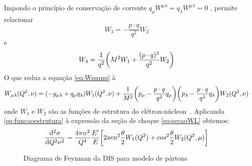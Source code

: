 Impondo o princípio de conservação de corrente $q_\mu W^{\mu\lambda} = q_ \lambda W^{\mu\lambda} = 0$ , permite relacionar
\begin{equation}
    W_ 3 = - \frac{p\cdot q}{q^2} W_ 2
\end{equation}
e
\begin{equation}
    W_ 4 = \frac{1}{q^2} \qty(M^2 W_1 + \frac{(p\cdot q) ^2}{q^2} W_ 2)
\end{equation}
O que reduz a equação \eqref{eq:Wmunu} à
\begin{equation}
    W_{\mu\lambda} (Q^2, \nu) =\qty (-g_{\mu\lambda} + q_\mu q_\lambda)W_ 1(Q^2,\nu) + \frac{1}{M^2} \qty(p_\mu - \frac{p\cdot q }{q^2}q_ \mu)\qty(p_\lambda - \frac{p\cdot q }{q^2}q_ \lambda) W_2(Q^2, \nu)
    \label{eq:funcaoestrutura}
\end{equation}
onde $W_1$ e $W_2$ são as funções de estrutura do elétron-núcleon~\cite{halzen_quarks_1984}. Aplicando \eqref{eq:funcaoestrutura} à expressão da seção de choque \eqref{eq:secaoWL} obtemos:
\begin{equation}
    \dv[2]{\sigma}{Q^2 \nu} = \frac{4\pi \alpha^2}{Q^4} \frac{E'}{E}\qty[2sen^2\frac{\theta}{2} W_1(Q^2) + cos^2\frac{\theta}{2}W_ 2 (Q^2,\mu)]
    \label{eq:crosssectiondis}
\end{equation}
\begin{figure}[!ht]
    \centering
    \caption{Diagrama de Feynman da DIS para modelo de pártons}
    \label{fig:disparton}
\end{figure}
